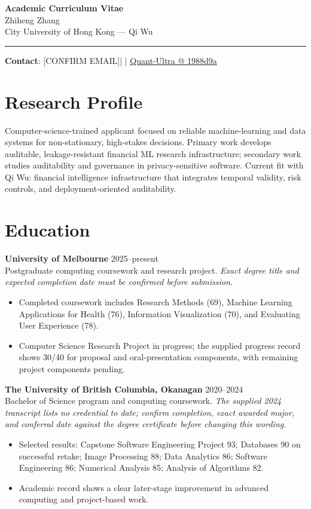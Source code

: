 \documentclass[11pt]{article}
\makeatletter
\newcommand{\ApplicantName}{Zhiheng Zhang}
\newcommand{\ApplicantEmail}{[CONFIRM EMAIL]}
\newcommand{\ApplicantPhone}{[CONFIRM PHONE]}
\newcommand{\ApplicantGitHub}{\href{https://github.com/zhiheng-zhang-Mera/Quant-Ultra/tree/1988d9a8530da91a8158de864d098ea869098923}{Quant-Ultra @ 1988d9a}}
\makeatother
\begin{document}
\begin{center}
{\LARGE\bfseries Academic Curriculum Vitae}\\[0.25em]
{\large \ApplicantName}\\
City University of Hong Kong --- Qi Wu
\end{center}
\vspace{0.35em}\hrule\vspace{0.65em}

\textbf{Contact}: \ApplicantEmail\quad | \quad \ApplicantPhone\quad | \quad \ApplicantGitHub

\section*{Research Profile}
Computer-science-trained applicant focused on reliable machine-learning and data systems for non-stationary, high-stakes decisions. Primary work develops auditable, leakage-resistant financial ML research infrastructure; secondary work studies auditability and governance in privacy-sensitive software. Current fit with Qi Wu: financial intelligence infrastructure that integrates temporal validity, risk controls, and deployment-oriented auditability.

\section*{Education}
\textbf{University of Melbourne} \hfill 2025--present\\
Postgraduate computing coursework and research project. \textit{Exact degree title and expected completion date must be confirmed before submission.}
\begin{itemize}
\item Completed coursework includes Research Methods (69), Machine Learning Applications for Health (76), Information Visualization (70), and Evaluating User Experience (78).
\item Computer Science Research Project in progress; the supplied progress record shows 30/40 for proposal and oral-presentation components, with remaining project components pending.
\end{itemize}

\textbf{The University of British Columbia, Okanagan} \hfill 2020--2024\\
Bachelor of Science program and computing coursework. \textit{The supplied 2024 transcript lists no credential to date; confirm completion, exact awarded major, and conferral date against the degree certificate before changing this wording.}
\begin{itemize}
\item Selected results: Capstone Software Engineering Project 93; Databases 90 on successful retake; Image Processing 88; Data Analytics 86; Software Engineering 86; Numerical Analysis 85; Analysis of Algorithms 82.
\item Academic record shows a clear later-stage improvement in advanced computing and project-based work.
\end{itemize}
\end{document}
